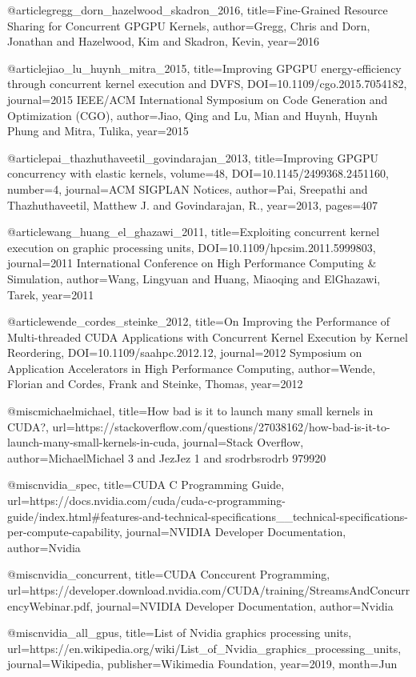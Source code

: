 @article{gregg_dorn_hazelwood_skadron_2016, title={Fine-Grained Resource Sharing for Concurrent GPGPU Kernels}, author={Gregg, Chris and Dorn, Jonathan and Hazelwood, Kim and Skadron, Kevin}, year={2016}} 

@article{jiao_lu_huynh_mitra_2015, title={Improving GPGPU energy-efficiency through concurrent kernel execution and DVFS}, DOI={10.1109/cgo.2015.7054182}, journal={2015 IEEE/ACM International Symposium on Code Generation and Optimization (CGO)}, author={Jiao, Qing and Lu, Mian and Huynh, Huynh Phung and Mitra, Tulika}, year={2015}} 

@article{pai_thazhuthaveetil_govindarajan_2013, title={Improving GPGPU concurrency with elastic kernels}, volume={48}, DOI={10.1145/2499368.2451160}, number={4}, journal={ACM SIGPLAN Notices}, author={Pai, Sreepathi and Thazhuthaveetil, Matthew J. and Govindarajan, R.}, year={2013}, pages={407}} 

@article{wang_huang_el_ghazawi_2011, title={Exploiting concurrent kernel execution on graphic processing units}, DOI={10.1109/hpcsim.2011.5999803}, journal={2011 International Conference on High Performance Computing \& Simulation}, author={Wang, Lingyuan and Huang, Miaoqing and ElGhazawi, Tarek}, year={2011}} 

@article{wende_cordes_steinke_2012, title={On Improving the Performance of Multi-threaded CUDA Applications with Concurrent Kernel Execution by Kernel Reordering}, DOI={10.1109/saahpc.2012.12}, journal={2012 Symposium on Application Accelerators in High Performance Computing}, author={Wende, Florian and Cordes, Frank and Steinke, Thomas}, year={2012}}

@misc{michaelmichael, title={How bad is it to launch many small kernels in CUDA?}, url={https://stackoverflow.com/questions/27038162/how-bad-is-it-to-launch-many-small-kernels-in-cuda}, journal={Stack Overflow}, author={MichaelMichael 3 and JezJez 1 and srodrbsrodrb 979920}}

@misc{nvidia_spec, title={CUDA C Programming Guide}, url={https://docs.nvidia.com/cuda/cuda-c-programming-guide/index.html#features-and-technical-specifications__technical-specifications-per-compute-capability}, journal={NVIDIA Developer Documentation}, author={Nvidia}}

@misc{nvidia_concurrent, title={CUDA Conccurent Programming}, url={https://developer.download.nvidia.com/CUDA/training/StreamsAndConcurrencyWebinar.pdf}, journal={NVIDIA Developer Documentation}, author={Nvidia}}

@misc{nvidia_all_gpus, title={List of Nvidia graphics processing units}, url={https://en.wikipedia.org/wiki/List_of_Nvidia_graphics_processing_units}, journal={Wikipedia}, publisher={Wikimedia Foundation}, year={2019}, month={Jun}}